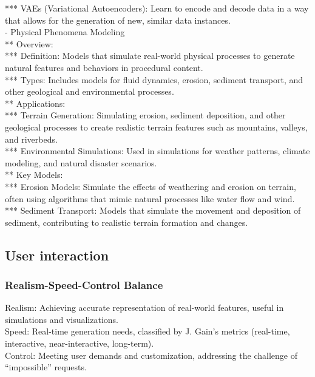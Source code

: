 *** VAEs (Variational Autoencoders): Learn to encode and decode data in a way that allows for the generation of new, similar data instances. \\
- Physical Phenomena Modeling \\
** Overview: \\
*** Definition: Models that simulate real-world physical processes to generate natural features and behaviors in procedural content. \\
*** Types: Includes models for fluid dynamics, erosion, sediment transport, and other geological and environmental processes. \\
** Applications: \\
*** Terrain Generation: Simulating erosion, sediment deposition, and other geological processes to create realistic terrain features such as mountains, valleys, and riverbeds. \\
*** Environmental Simulations: Used in simulations for weather patterns, climate modeling, and natural disaster scenarios. \\
** Key Models: \\
*** Erosion Models: Simulate the effects of weathering and erosion on terrain, often using algorithms that mimic natural processes like water flow and wind. \\
*** Sediment Transport: Models that simulate the movement and deposition of sediment, contributing to realistic terrain formation and changes.

\subsection{User interaction}
\subsubsection{Realism-Speed-Control Balance}
Realism: Achieving accurate representation of real-world features, useful in simulations and visualizations. \\
Speed: Real-time generation needs, classified by J. Gain's metrics (real-time, interactive, near-interactive, long-term). \\
Control: Meeting user demands and customization, addressing the challenge of “impossible” requests.

